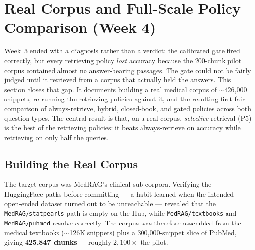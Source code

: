 %

\section{Real Corpus and Full-Scale Policy Comparison (Week 4)}
\label{sec:impl-week4}

Week~3 ended with a diagnosis rather than a verdict: the calibrated gate fired
correctly, but every retrieving policy \emph{lost} accuracy because the 200-chunk
pilot corpus contained almost no answer-bearing passages. The gate could not be
fairly judged until it retrieved from a corpus that actually held the answers.
This section closes that gap. It documents building a real medical corpus of
$\sim$426{,}000 snippets, re-running the retrieving policies against it, and the
resulting first fair comparison of always-retrieve, hybrid, closed-book, and
gated policies across both question types. The central result is that, on a real
corpus, \emph{selective} retrieval (P5) is the best of the retrieving policies:
it beats always-retrieve on accuracy while retrieving on only half the queries.

\subsection{Building the Real Corpus}
\label{sec:medcorp-build}

The target corpus was MedRAG's clinical sub-corpora. Verifying the HuggingFace
paths before committing --- a habit learned when the intended open-ended dataset
turned out to be unreachable --- revealed that the \texttt{MedRAG/statpearls}
path is empty on the Hub, while \texttt{MedRAG/textbooks} and
\texttt{MedRAG/pubmed} resolve correctly. The corpus was therefore assembled from
the medical textbooks ($\sim$126K snippets) plus a 300{,}000-snippet slice of
PubMed, giving \textbf{425{,}847 chunks} --- roughly $2{,}100\times$ the pilot.

